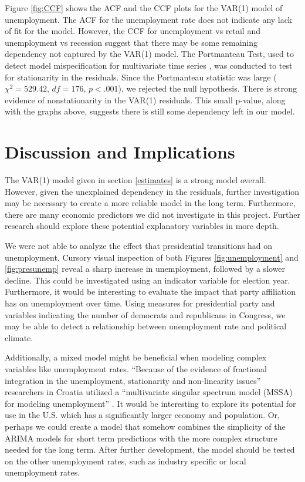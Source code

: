 \documentclass[twoside,twocolumn]{article}
\begin{document}
Figure \ref{fig:CCF} shows the ACF and the CCF plots for the VAR(1) model of unemployment.  The ACF for the unemployment rate does not indicate any lack of fit for the model. However, the CCF for unemployment vs retail and unemployment vs recession suggest that there may be some remaining dependency not captured by the VAR(1) model.   The Portmanteau Test, used to detect model mispecification for multivariate time series \citep{davies1979}, was conducted to test for stationarity in the residuals. Since the Portmanteau statistic was large (\(\chi^2=529.42\), \(df = 176\), \(p < .001\)), we rejected the null hypothesis. There is  strong evidence of nonstationarity in the VAR(1) residuals. This small p-value, along with the graphs above, suggests there is still some dependency left in our model.

\section{Discussion and Implications}

The VAR(1) model given in section \ref{estimates} is a strong model overall. However, given the unexplained dependency in the residuals, further investigation may be necessary to create a more reliable model in the long term. Furthermore, there are many economic predictors we did not investigate in this project. Further research should explore these potential explanatory variables in more depth.

We were not able to analyze the effect that presidential transitions had on unemployment.  Cursory visual inspection of both Figures \ref{fig:unemployment} and \ref{fig:presunemp} reveal a sharp increase in unemployment, followed by a slower decline.   This could be investigated using an indicator variable for election year.  Furthermore, it would be interesting to evaluate the impact that party affiliation has on unemployment over time.  Using measures for presidential party and variables indicating the number of democrats and republicans in Congress, we may be able to detect a relationship between unemployment rate and political climate.

Additionally, a mixed model might be beneficial when modeling complex variables like unemployment rates.  ``Because of the evidence of fractional integration in the unemployment, stationarity and non-linearity issues'' researchers in Croatia utilized a ``multivariate singular spectrum model (MSSA) for modeling unemployment'' \citep{Skare2015}. It would be interesting to explore its potential for use in the U.S. which has a significantly larger economy and population.  Or, perhaps we could create a model that somehow combines the simplicity of the ARIMA models for short term predictions with the more complex structure needed for the long term. After further development, the model should be tested on the other unemployment rates, such as industry specific or local unemployment rates.
\end{document}
